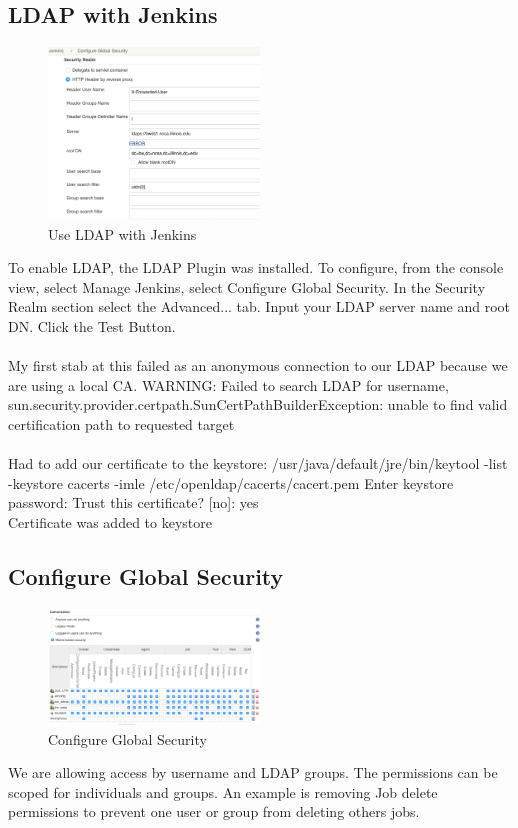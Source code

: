 \documentclass[10pt, conference, compsocconf]{IEEEtran}
\begin{document}
\subsection{LDAP with Jenkins}
\begin{figure}[H]
\centering
\includegraphics[width=0.5\textwidth]{LDAP-Jenkins}
\caption{ Use LDAP with Jenkins }
\label{fig:LDAP-Jenkins}
\end{figure}
To enable LDAP, the LDAP Plugin was installed. To configure, from the console view, select Manage Jenkins, select Configure Global Security. In the Security Realm section select the Advanced... tab. Input your LDAP server name and root DN. Click the Test Button.\\
\\
My first stab at this failed as an anonymous connection to our LDAP because we are using a local CA.
WARNING: Failed to search LDAP for username, 
sun.security.provider.certpath.SunCertPathBuilderException:
unable to find valid certification path to requested target\\
\\
Had to add our certificate to the keystore:
/usr/java/default/jre/bin/keytool -list -keystore cacerts -imle /etc/openldap/cacerts/cacert.pem
Enter keystore password: Trust this certificate? [no]:  yes\\
Certificate was added to keystore

\subsection{Configure Global Security}
\begin{figure}[H]
\centering
\includegraphics[width=0.5\textwidth]{Configure-Global-Security}
\caption{ Configure Global Security }
\label{fig:Configure-Global-Security}
\end{figure}
We are allowing access by username and LDAP groups. The permissions can be scoped for individuals and groups. An example is removing Job delete permissions to prevent one user or group from deleting others jobs. 
\end{document}

